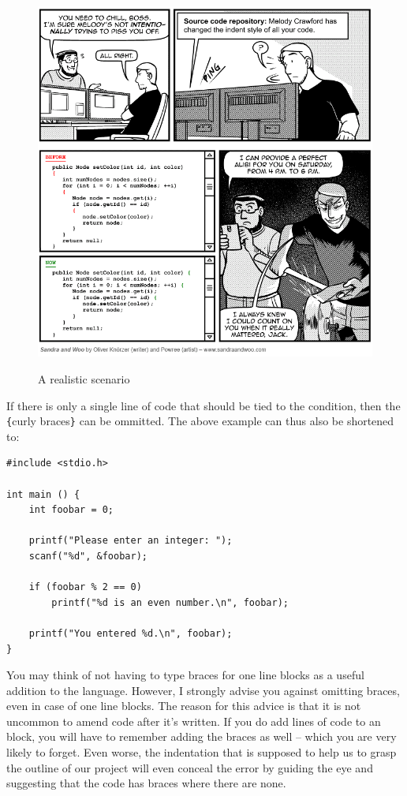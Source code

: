 \begin{figure}
	\href{http://www.sandraandwoo.com/2015/04/13/0674-there-are-10-types-of-programmers/}{
		\includegraphics[width=\linewidth]{./gfx/SW-indent-style}
	}
	\caption{A realistic scenario} \label{fig:IndentStyle}
\end{figure}

If there is only a single line of code that should be tied to the condition, then the \texttt{\{}curly braces\texttt{\}} can be ommitted. The above example can thus also be shortened to:
\begin{codebox}[evenNumbers.c]
\begin{verbatim}
#include <stdio.h>

int main () {
    int foobar = 0;

    printf("Please enter an integer: ");
    scanf("%d", &foobar);

    if (foobar % 2 == 0)
        printf("%d is an even number.\n", foobar);

    printf("You entered %d.\n", foobar);
}
\end{verbatim}
\end{codebox}

You may think of not having to type braces for one line  blocks as a useful addition to the language. However, I strongly advise you against omitting braces, even in case of one line blocks. The reason for this advice is that it is not uncommon to amend code after it's written. If you do add lines of code to an  block, you will have to remember adding the braces as well -- which you are very likely to forget. Even worse, the indentation that is supposed to help us to grasp the outline of our project will even conceal the error by guiding the eye and suggesting that the code has braces where there are none.

